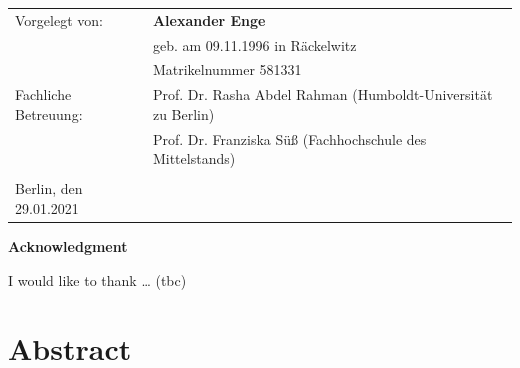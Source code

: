 \documentclass[
  english,
  doc,12pt,twoside,floatsintext]{apa7}
\begin{document}
\begin{flushleft}
{
\begin{tabular}{ll}
Vorgelegt von:&\textbf{Alexander Enge}\\
&geb. am 09.11.1996 in Räckelwitz\\
&Matrikelnummer 581331\\
Fachliche Betreuung:&Prof. Dr. Rasha Abdel Rahman (Humboldt-Universität zu Berlin)\\
&Prof. Dr. Franziska Süß (Fachhochschule des Mittelstands)\\
&\\
Berlin, den 29.01.2021&\\
\end{tabular}
}
\end{flushleft}

\clearpage

\mbox{}\thispagestyle{empty}\clearpage

\thispagestyle{empty}

\begin{center}\textbf{Acknowledgment}\end{center}

I would like to thank \ldots{} (tbc)

\clearpage

\mbox{}\thispagestyle{empty}\clearpage

\thispagestyle{empty}
\begin{flushleft}
{
\tableofcontents
}
\end{flushleft}

\clearpage

\mbox{}\thispagestyle{empty}\clearpage

\setcounter{page}{1}

\hypertarget{abstract}{%
\section*{Abstract}\label{abstract}}
\end{document}
